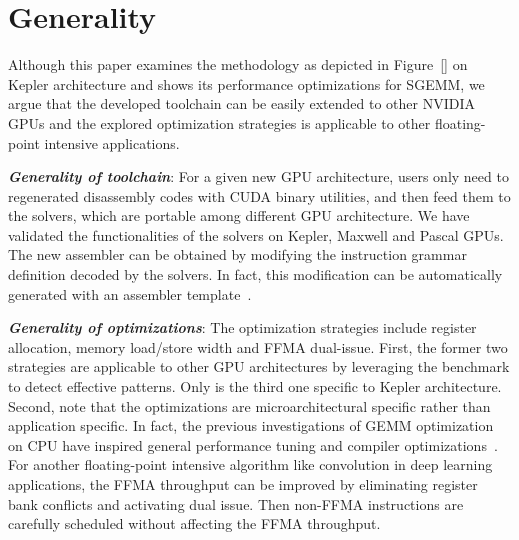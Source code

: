 \section{Generality}
\label{sec:generality}

Although this paper examines the methodology as depicted in Figure~\ref{} on Kepler architecture and shows its performance optimizations for SGEMM, we argue that the developed toolchain can be easily extended to other NVIDIA GPUs and the explored optimization strategies is applicable to other floating-point intensive applications.

{\em {\bf Generality of toolchain}}: For a given new GPU architecture, users only need to regenerated disassembly codes with CUDA binary utilities, and then feed them to the solvers, which are portable among different GPU architecture. We have validated the functionalities of the solvers on Kepler, Maxwell and Pascal GPUs. The new assembler can be obtained by modifying the instruction grammar definition decoded by the solvers. In fact, this modification can be automatically generated with an assembler template~\cite{}. 

{\em {\bf Generality of optimizations}}: The optimization strategies include register allocation, memory load/store width and FFMA dual-issue. First, the former two strategies are applicable to other GPU architectures by leveraging the benchmark to detect effective patterns. Only is the third one specific to Kepler architecture. Second, note that the optimizations are microarchitectural specific rather than application specific. In fact, the previous investigations of GEMM optimization on CPU have inspired general performance tuning and compiler optimizations~\cite{}.  For another floating-point intensive algorithm like convolution in deep learning applications, the FFMA throughput can be improved by eliminating register bank conflicts and activating dual issue. Then non-FFMA instructions are carefully scheduled without affecting the FFMA throughput. 


